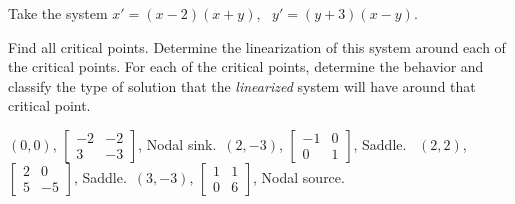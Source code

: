 \begin{exercise}
Take the system $x' = (x-2)(x+y)$, \ $y' = (y+3)(x-y)$.
\begin{tasks}
\task Find all critical points.
\task Determine the linearization of this system around each of the critical points.
\task For each of the critical points, determine the behavior and classify the type of solution that the \emph{linearized} system will have around that critical point. 
\end{tasks}
\end{exercise}
\comboSol{%
}
{%
$(0,0)$, $\left[\begin{smallmatrix} -2 & -2 \\ 3 & -3 \end{smallmatrix}\right]$, Nodal sink.\ $(2, -3)$, $\left[\begin{smallmatrix} -1 & 0 \\ 0 & 1 \end{smallmatrix}\right]$, Saddle. \ 
$(2, 2)$, $\left[\begin{smallmatrix} 2 & 0 \\ 5 & -5 \end{smallmatrix}\right]$, Saddle.\ 
$(3, -3)$, $\left[\begin{smallmatrix} 1 & 1 \\ 0 & 6 \end{smallmatrix}\right]$, Nodal source. 
}

